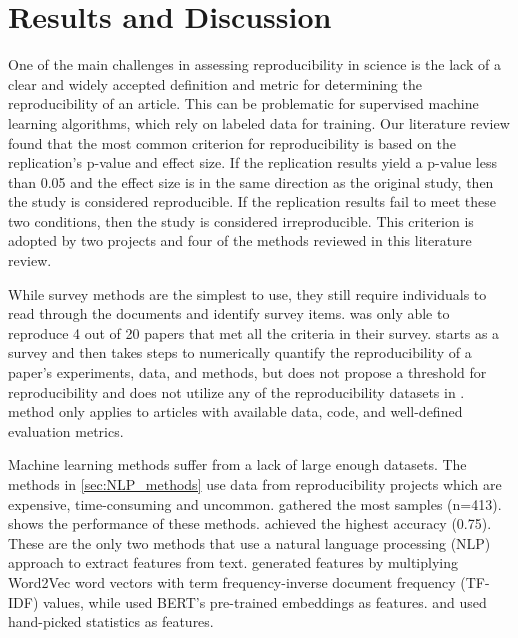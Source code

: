 \documentclass[12pt, a4paper, twocolumn]{article}
\begin{document}
	\section{Results and Discussion} \label{sec:Results}
		One of the main challenges in assessing reproducibility in science is the lack of a clear and widely accepted definition and metric for determining the reproducibility of an article. This can be problematic for supervised machine learning algorithms, which rely on labeled data for training. Our literature review found that the most common criterion for reproducibility is based on the replication's p-value and effect size. If the replication results yield a p-value less than 0.05 and the effect size is in the same direction as the original study, then the study is considered reproducible. If the replication results fail to meet these two conditions, then the study is considered irreproducible. This criterion is adopted by two projects and four of the methods reviewed in this literature review.

While survey methods are the simplest to use, they still require individuals to read through the documents and identify survey items. \citet{stagge2019assessing} was only able to reproduce 4 out of 20 papers that met all the criteria in their survey. \citet{gundersen2018state} starts as a survey and then takes steps to numerically quantify the reproducibility of a paper's experiments, data, and methods, but does not propose a threshold for reproducibility and does not utilize any of the reproducibility datasets in . \citet{belz2022quantified} method only applies to articles with available data, code, and well-defined evaluation metrics.

Machine learning methods suffer from a lack of large enough datasets. The methods in \ref{sec:NLP_methods} use data from reproducibility projects which are expensive, time-consuming and uncommon. \citeyear{Yang2020estimating} gathered the most samples (n=413).   shows the performance of these methods. \citet{Luo2022sentence} achieved the highest accuracy (0.75). These are the only two methods that use a natural language processing (NLP) approach to extract features from text. \citeyear{Yang2020estimating} generated features by multiplying Word2Vec word vectors with term frequency-inverse document frequency (TF-IDF) values, while \citet{Luo2022sentence} used BERT's pre-trained embeddings as features.  \citeyear{Altmejd2019predicting} and  \citeyear{wu2021predicting} used hand-picked statistics as features.
\end{document}
